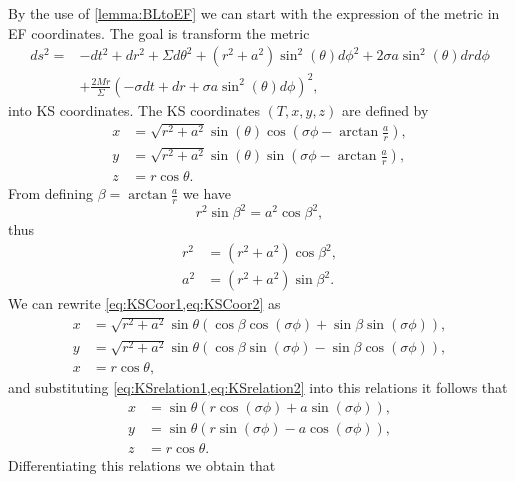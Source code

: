 \begin{Proof}
By the use of  \cref{lemma:BLtoEF} we can start with the expression of the metric in \gls{EF} coordinates. The goal is transform the metric
\begin{equation}
\begin{aligned}
 ds^2=&-dt^2+dr^2+\Sigma d\theta^2+(r^2+a^2) \sin^2{(\theta)} d\phi^2+2\sigma a \sin^2{(\theta)} dr d\phi\\
 &+\frac{2M r}{\Sigma}(-\sigma dt+ dr+\sigma a \sin^2{(\theta)} d\phi)^2,
 \end{aligned}
\end{equation}
into \gls{KS} coordinates. The \gls{KS} \cite{kerr1965new} coordinates $(T,x,y,z)$ are defined by
\begin{align}
 x&=\sqrt{r^2+a^2} \sin{(\theta)} \cos\left( \sigma\phi- \arctan{\frac{a}{r}} \right), \label{eq:KSCoor1}\\
 y&=\sqrt{r^2+a^2} \sin{(\theta)} \sin \left( \sigma\phi- \arctan{\frac{a}{r}} \right), \label{eq:KSCoor2}\\
 z&=r\cos{\theta} \label{eq:KSCoor3}.
\end{align}
From defining $\beta=\arctan{\frac{a}{r}}$  we have
\begin{equation}
 r^2 \sin{\beta}^2=a^2 \cos{\beta}^2,
\end{equation}
thus
\begin{align}
 r^2&=(r^2+a^2)\cos{\beta}^2, \label{eq:KSrelation1} \\
 a^2&=(r^2+a^2)\sin{\beta}^2. \label{eq:KSrelation2}
\end{align}
We can rewrite \cref{eq:KSCoor1,eq:KSCoor2} as
\begin{align}
x&=\sqrt{r^2+a^2} \sin{\theta} ( \cos{\beta} \cos{(\sigma \phi)}+ \sin{\beta} \sin{(\sigma\phi)}), \\
y&=\sqrt{r^2+a^2} \sin{\theta} ( \cos{\beta} \sin{(\sigma \phi)}- \sin{\beta} \cos{(\sigma\phi)}), \\
x&=r\cos{\theta},
\end{align}
and substituting \cref{eq:KSrelation1,eq:KSrelation2} into this relations it follows that
\begin{align}
 x&= \sin{\theta} ( r \cos{(\sigma\phi)}+ a \sin{(\sigma\phi)}) \label{eq:KSCoor1fina}, \\
 y&= \sin{\theta} ( r \sin{(\sigma\phi)}- a \cos{(\sigma\phi)}) \label{eq:KSCoor2fina}, \\
 z&=r\cos{\theta} \label{eq:KSCoor3fina}.
\end{align}
Differentiating this relations we obtain that

\end{Proof}
